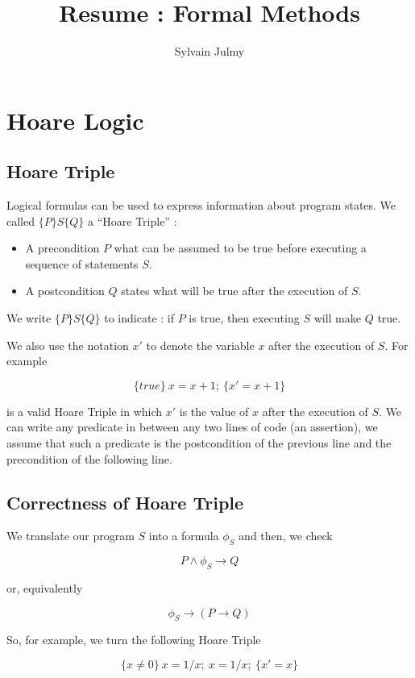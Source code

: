 \documentclass[a4paper,11pt]{report}
\title{Resume : Formal Methods}
\author{Sylvain Julmy}
\begin{document}
\maketitle

\chapter{Hoare Logic}

\section{Hoare Triple}

Logical formulas can be used to express information about program states. We
called $\{P\}S\{Q\}$ a ``Hoare Triple'' :

\begin{itemize}
\item A precondition $P$ what can be assumed to be true before executing a
  sequence of statements $S$.
\item A postcondition $Q$ states what will be true after the execution of $S$.
\end{itemize}

We write $\{P\}S\{Q\}$ to indicate : if $P$ is true, then executing $S$ will
make $Q$ true.

We also use the notation $x'$ to denote the variable $x$ after the execution of
$S$. For example

\[
  \{true\}\ x = x + 1;\ \{x' = x + 1\}
\]

is a valid Hoare Triple in which $x'$ is the value of $x$ after the execution
of $S$. We can write any predicate in between any two lines of code (an
assertion), we assume that such a predicate is the postcondition of the previous
line and the precondition of the following line.

\section{Correctness of Hoare Triple}

We translate our program $S$ into a formula $\phi_S$ and then, we check

\[
  P \wedge \phi_S \to Q
\]

or, equivalently

\[
  \phi_S \to (P \to Q)
\]

So, for example, we turn the following Hoare Triple

\[
  \{x \neq 0\}\ x=1/x;\ x=1/x; \ \{x' = x\}
\]
\end{document}
